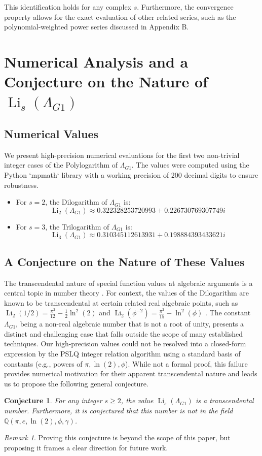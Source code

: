 \documentclass{amsart}
\theoremstyle{plain}
\newtheorem{conjecture}[theorem]{Conjecture}
\theoremstyle{definition}
\theoremstyle{remark}
\newtheorem*{remark}{Remark}
\DeclareMathOperator{\Li}{Li} %
\newcommand{\LambdaG}{\Lambda_{G1}}
\begin{document}
This identification holds for any complex $s$. Furthermore, the convergence property allows for the exact evaluation of other related series, such as the polynomial-weighted power series discussed in Appendix B.

\section{Numerical Analysis and a Conjecture on the Nature of \texorpdfstring{$\Li_s(\LambdaG)$}{Li\_s(Lambda\_G1)}}

\subsection{Numerical Values}
We present high-precision numerical evaluations for the first two non-trivial integer cases of the Polylogarithm of $\LambdaG$.
The values were computed using the Python `mpmath` library with a working precision of 200 decimal digits to ensure robustness.
\begin{itemize}
    \item For $s=2$, the Dilogarithm of $\LambdaG$ is:
    $$ \Li_2(\LambdaG) \approx 0.322328253720993 + 0.226730769307749i $$
    
    \item For $s=3$, the Trilogarithm of $\LambdaG$ is:
    $$ \Li_3(\LambdaG) \approx 0.310345112613931 + 0.198884393433621i $$
    
\end{itemize}

\subsection{A Conjecture on the Nature of These Values}
The transcendental nature of special function values at algebraic arguments is a central topic in number theory \cite{Baker}.
For context, the values of the Dilogarithm are known to be transcendental at certain related real algebraic points, such as $\Li_2(1/2) = \frac{\pi^2}{12} - \frac{1}{2}\ln^2(2)$ and $\Li_2(\phi^{-2}) = \frac{\pi^2}{15} - \ln^2(\phi)$ \cite{Lewin}.
The constant $\LambdaG$, being a non-real algebraic number that is not a root of unity, presents a distinct and challenging case that falls outside the scope of many established techniques.
Our high-precision values could not be resolved into a closed-form expression by the PSLQ integer relation algorithm using a standard basis of constants (e.g., powers of $\pi, \ln(2), \phi$).
While not a formal proof, this failure provides numerical motivation for their apparent transcendental nature and leads us to propose the following general conjecture.
\begin{conjecture}
For any integer $s \ge 2$, the value $\Li_s(\LambdaG)$ is a transcendental number.
Furthermore, it is conjectured that this number is not in the field $\mathbb{Q}(\pi, e, \ln(2), \phi, \gamma)$.
\end{conjecture}
\begin{remark}
Proving this conjecture is beyond the scope of this paper, but proposing it frames a clear direction for future work.
\end{remark}
\end{document}
